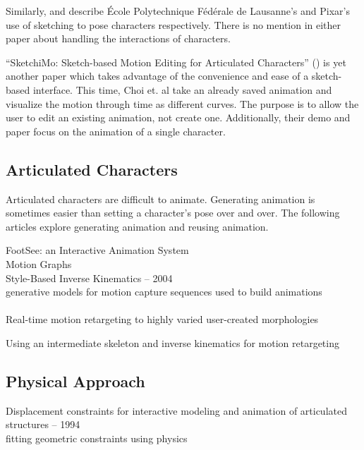 Similarly, \citep{mahmudi2016artist} and \citep{stelzleni2015sketch} describe \'Ecole Polytechnique F\'ed\'erale de Lausanne's and Pixar's use of sketching to pose characters respectively. There is no mention in either paper about handling the interactions of characters. 

``SketchiMo: Sketch-based Motion Editing for Articulated Characters'' (\citep{choi2016sketchimo}) is yet another paper which takes advantage of the convenience and ease of a sketch-based interface. This time,  Choi et. al take an already saved animation and visualize the motion through time as different curves. The purpose is to allow the user to edit an existing animation, not create one. Additionally, their demo and paper focus on the animation of a single character.


\subsection{Articulated Characters}
Articulated characters are difficult to animate. Generating animation is sometimes easier than setting a character's pose over and over. The following articles explore generating animation and reusing animation.
 
FootSee: an Interactive Animation System \citep{yin2003footsee} \\

Motion Graphs \citep{kovar2002motion}\\

Style-Based Inverse Kinematics -- 2004 \citep{grochow2004style}\\
generative models for motion capture sequences used to build animations\\\\

Real-time motion retargeting to highly varied user-created morphologies\\
\citep{hecker2008real}

Using an intermediate skeleton and inverse kinematics for motion retargeting
\citep{monzani2000using}

\subsection{Physical Approach}
Displacement constraints for interactive modeling and animation of articulated structures -- 1994 \citep{gascuel1994displacement}\\

fitting geometric constraints using physics\\\\

